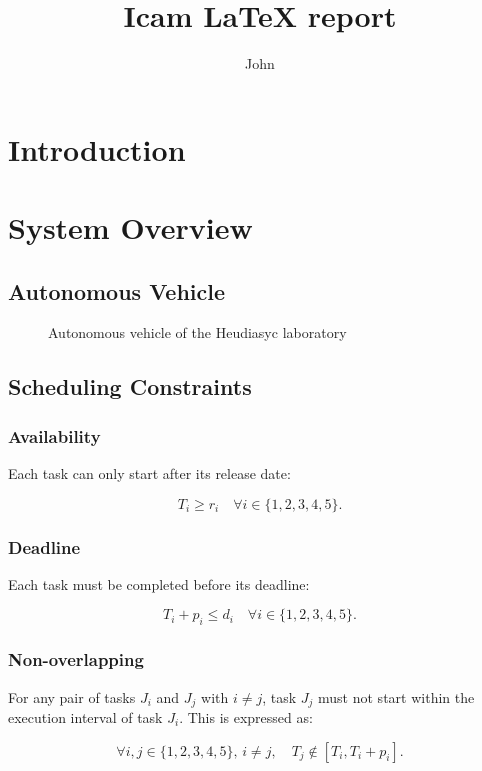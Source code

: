 \documentclass{icam-report/icam-report}
\title{Icam LaTeX report}
\author{John \sc{DOE}}
\begin{document}
\maketitlepage

\tableofcontents{}

\pagebreak

\section{Introduction}
\lipsum[1]

\section{System Overview}

\subsection{Autonomous Vehicle}

\begin{figure}[h]
    \centering
    \caption{Autonomous vehicle of the Heudiasyc laboratory}
\end{figure}

\lipsum[2]

\pagebreak

\subsection{Scheduling Constraints}

\subsubsection*{Availability}

Each task can only start after its release date:

\[
    T_i \geq r_i \quad \forall i \in \{1, 2, 3, 4, 5\}.
\]

\subsubsection*{Deadline}

Each task must be completed before its deadline:

\[
    T_i + p_i \leq d_i \quad \forall i \in \{1, 2, 3, 4, 5\}.
\]

\subsubsection*{Non-overlapping}

For any pair of tasks \( J_i \) and \( J_j \) with \( i \neq j \), task \( J_j \) must not start within the execution interval of task \( J_i \). This is expressed as:

\[
    \forall i, j \in \{1, 2, 3, 4, 5\}, \, i \neq j, \quad T_j \notin [T_i, T_i + p_i].
\]
\end{document}
